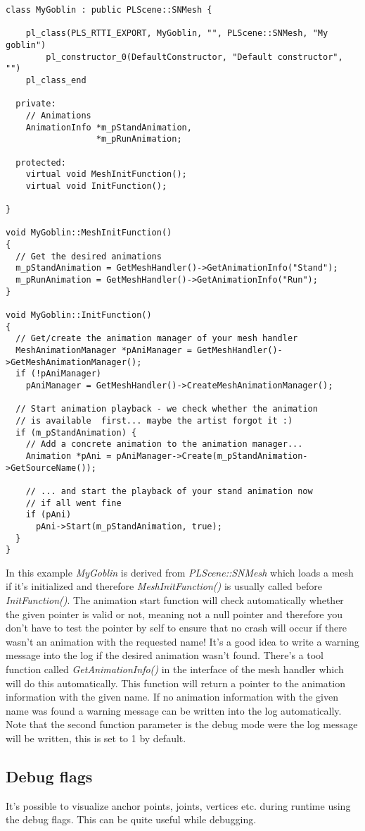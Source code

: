 \begin{lstlisting}[caption=Derived mesh scene node]
class MyGoblin : public PLScene::SNMesh {

	pl_class(PLS_RTTI_EXPORT, MyGoblin, "", PLScene::SNMesh, "My goblin")
		pl_constructor_0(DefaultConstructor, "Default constructor", "")
	pl_class_end

  private:
    // Animations
    AnimationInfo *m_pStandAnimation,
                  *m_pRunAnimation;

  protected:
    virtual void MeshInitFunction();
    virtual void InitFunction();

}

void MyGoblin::MeshInitFunction()
{
  // Get the desired animations
  m_pStandAnimation = GetMeshHandler()->GetAnimationInfo("Stand");
  m_pRunAnimation = GetMeshHandler()->GetAnimationInfo("Run");
}

void MyGoblin::InitFunction()
{
  // Get/create the animation manager of your mesh handler
  MeshAnimationManager *pAniManager = GetMeshHandler()->GetMeshAnimationManager();
  if (!pAniManager)
    pAniManager = GetMeshHandler()->CreateMeshAnimationManager();

  // Start animation playback - we check whether the animation
  // is available  first... maybe the artist forgot it :)
  if (m_pStandAnimation) {
    // Add a concrete animation to the animation manager...
    Animation *pAni = pAniManager->Create(m_pStandAnimation->GetSourceName());

    // ... and start the playback of your stand animation now
    // if all went fine
    if (pAni)
      pAni->Start(m_pStandAnimation, true);
  }
}
\end{lstlisting}

In this example \emph{MyGoblin} is derived from \emph{PLScene::SNMesh} which loads a mesh if it's initialized and therefore \emph{MeshInitFunction()} is usually called before \emph{InitFunction()}. The animation start function will check automatically whether the given pointer is valid or not, meaning not a null pointer and therefore you don't have to test the pointer by self to ensure that no crash will occur if there wasn't an animation with the requested name! It's a good idea to write a warning message into the log if the desired animation wasn't found. There's a tool function called \emph{GetAnimationInfo()} in the interface of the mesh handler which will do this automatically. This function will return a pointer to the animation information with the given name. If no animation information with the given name was found a warning message can  be written into the log automatically. Note that the second function parameter is the debug mode were the log message will be written, this is set to 1 by default.


\subsection{Debug flags}
It's possible to visualize anchor points, joints, vertices etc. during runtime using the debug flags. This can be quite useful while debugging.
